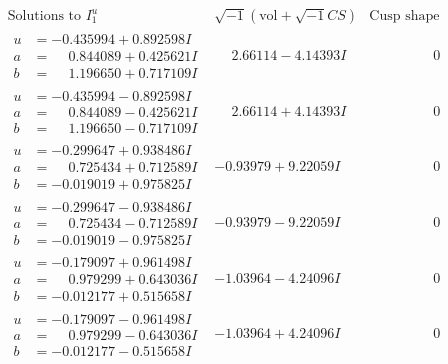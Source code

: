 \documentclass[1p]{elsarticle_modified}
\theoremstyle{definition}
\newcommand{\I}{\sqrt{-1}}
\begin{document}
$$\begin{array}{c|c|c}  
\text{Solutions to }I^u_{1}& \I (\text{vol} + \sqrt{-1}CS) & \text{Cusp shape}\\
 \hline 
\begin{aligned}
u &= -0.435994 + 0.892598 I \\
a &= \phantom{-}0.844089 + 0.425621 I \\
b &= \phantom{-}1.196650 + 0.717109 I\end{aligned}
 & \phantom{-}2.66114 - 4.14393 I & \phantom{-0.000000 } 0 \\ \hline\begin{aligned}
u &= -0.435994 - 0.892598 I \\
a &= \phantom{-}0.844089 - 0.425621 I \\
b &= \phantom{-}1.196650 - 0.717109 I\end{aligned}
 & \phantom{-}2.66114 + 4.14393 I & \phantom{-0.000000 } 0 \\ \hline\begin{aligned}
u &= -0.299647 + 0.938486 I \\
a &= \phantom{-}0.725434 + 0.712589 I \\
b &= -0.019019 + 0.975825 I\end{aligned}
 & -0.93979 + 9.22059 I & \phantom{-0.000000 } 0 \\ \hline\begin{aligned}
u &= -0.299647 - 0.938486 I \\
a &= \phantom{-}0.725434 - 0.712589 I \\
b &= -0.019019 - 0.975825 I\end{aligned}
 & -0.93979 - 9.22059 I & \phantom{-0.000000 } 0 \\ \hline\begin{aligned}
u &= -0.179097 + 0.961498 I \\
a &= \phantom{-}0.979299 + 0.643036 I \\
b &= -0.012177 + 0.515658 I\end{aligned}
 & -1.03964 - 4.24096 I & \phantom{-0.000000 } 0 \\ \hline\begin{aligned}
u &= -0.179097 - 0.961498 I \\
a &= \phantom{-}0.979299 - 0.643036 I \\
b &= -0.012177 - 0.515658 I\end{aligned}
 & -1.03964 + 4.24096 I & \phantom{-0.000000 } 0 \\ \hline\begin{aligned}

\end{aligned}
\end{array}$$
\end{document}
